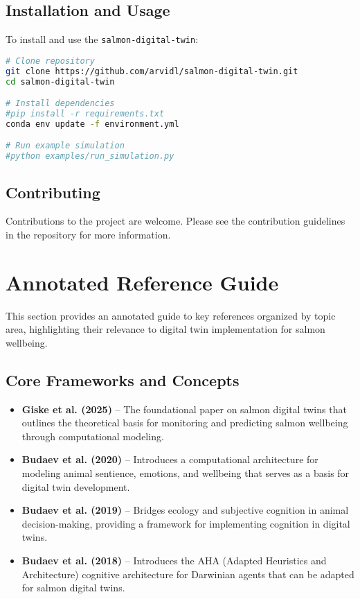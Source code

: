 \documentclass[11pt,a4paper]{article}
\begin{document}
\subsection{Installation and Usage}
To install and use the \texttt{salmon-digital-twin}:

\begin{lstlisting}[language=bash]
# Clone repository
git clone https://github.com/arvidl/salmon-digital-twin.git
cd salmon-digital-twin

# Install dependencies
#pip install -r requirements.txt
conda env update -f environment.yml

# Run example simulation
#python examples/run_simulation.py
\end{lstlisting}



\subsection{Contributing}
Contributions to the project are welcome. Please see the contribution guidelines in the repository for more information.


\section*{Annotated Reference Guide}

This section provides an annotated guide to key references organized by topic area, highlighting their relevance to digital twin implementation for salmon wellbeing.

\subsection*{Core Frameworks and Concepts}
\begin{itemize}
    \item \textbf{Giske et al. (2025)} \cite{giske2025premises} -- The foundational paper on salmon digital twins that outlines the theoretical basis for monitoring and predicting salmon wellbeing through computational modeling.
    
    \item \textbf{Budaev et al. (2020)} \cite{budaev2020computational} -- Introduces a computational architecture for modeling animal sentience, emotions, and wellbeing that serves as a basis for digital twin development.
    
    \item \textbf{Budaev et al. (2019)} \cite{budaev2019decision} -- Bridges ecology and subjective cognition in animal decision-making, providing a framework for implementing cognition in digital twins.
    
    \item \textbf{Budaev et al. (2018)} \cite{budaev2018aha} -- Introduces the AHA (Adapted Heuristics and Architecture) cognitive architecture for Darwinian agents that can be adapted for salmon digital twins.
\end{itemize}
\end{document}
